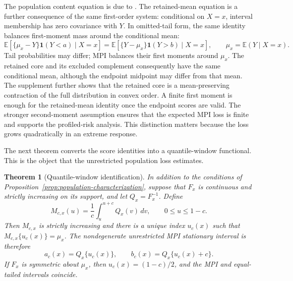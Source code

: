 \documentclass[11pt]{article}
\numberwithin{equation}{section}
\newcommand{\E}{\mathbb{E}}
\newcommand{\ind}{\mathbf{1}}
\newtheorem{theorem}{Theorem}
\begin{document}
The population content equation is due to
\citet{PouplinEtAl2024RQR}. The retained-mean equation is a further
consequence of the same first-order system: conditional on \(X=x\), interval
membership has zero covariance with \(Y\). In omitted-tail form, the same
identity balances first-moment mass around the conditional mean:
\[
\E[\{\mu_x-Y\}\ind(Y<a)\mid X=x]
=
\E[\{Y-\mu_x\}\ind(Y>b)\mid X=x],
\qquad \mu_x=\E(Y\mid X=x).
\]
Tail probabilities may differ; MPI balances their first moments around
\(\mu_x\). The retained core and its excluded complement consequently have the
same conditional mean, although the endpoint midpoint may differ from that
mean. The supplement further shows that the retained core is a mean-preserving
contraction of the full distribution in convex order. A finite first moment is
enough for the retained-mean identity once the endpoint scores are valid. The
stronger second-moment assumption ensures that the expected MPI loss
is finite and supports the profiled-risk analysis. This distinction matters
because the loss grows quadratically in an extreme response.

The next theorem converts the score identities into a quantile-window
functional. This is the object that the unrestricted population loss estimates.

\begin{theorem}[Quantile-window identification]
\label{thm:quantile-window}
In addition to the conditions of
Proposition~\ref{prop:population-characterization}, suppose that \(F_x\) is
continuous and strictly increasing on its support, and let \(Q_x=F_x^{-1}\).
Define
\[
M_{c,x}(u)=\frac{1}{c}\int_u^{u+c}Q_x(v)\,dv,
\qquad 0\le u\le1-c.
\]
Then \(M_{c,x}\) is strictly increasing and there is a unique index \(u_c(x)\)
such that \(M_{c,x}\{u_c(x)\}=\mu_x\). The nondegenerate unrestricted MPI
stationary interval is therefore
\[
a_c(x)=Q_x\{u_c(x)\},\qquad
b_c(x)=Q_x\{u_c(x)+c\}.
\]
If \(F_x\) is symmetric about \(\mu_x\), then
\(u_c(x)=(1-c)/2\), and the MPI and equal-tailed intervals coincide.
\end{theorem}
\end{document}
